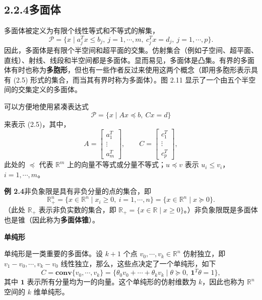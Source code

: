 \documentclass[UTF8,12pt,a4paper,fontset=fandol]{ctexart}
\begin{document}
\subsection*{2.2.4\quad 多面体}

多面体被定义为有限个线性等式和不等式的解集，
\begin{equation}
  \mathcal{P}=\{x\mid a_j^Tx\le b_j,\ j=1,\cdots,m,\ c_j^Tx=d_j,\ j=1,\cdots,p\}.
  \tag{2.5}
\end{equation}
因此，多面体是有限个半空间和超平面的交集。仿射集合（例如子空间、超平面、直线）、射线、线段和半空间都是多面体。显而易见，多面体是凸集。有界的多面体有时也称为\textbf{多胞形}，但也有一些作者反过来使用这两个概念（即用多胞形表示具有 (2.5) 形式的集合，而当其有界时称为多面体）。图 2.11 显示了一个由五个半空间的交集定义的多面体。

可以方便地使用紧凑表达式
\begin{equation}
  \mathcal{P}=\{x\mid Ax\preceq b,\ Cx=d\}
  \tag{2.6}
\end{equation}
来表示 (2.5)，其中，
\[
  A=
  \begin{bmatrix}
    a_1^T\\
    \vdots\\
    a_m^T
  \end{bmatrix},
  \qquad
  C=
  \begin{bmatrix}
    c_1^T\\
    \vdots\\
    c_p^T
  \end{bmatrix},
\]
此处的 $\preceq$ 代表 $\mathbb{R}^m$ 上的向量不等式或分量不等式；$u\preceq v$ 表示 $u_i\le v_i$，$i=1,\cdots,m$。

\noindent\textbf{例 2.4}\quad 非负象限是具有非负分量的点的集合，即
\[
  \mathbb{R}_+^n=\{x\in\mathbb{R}^n\mid x_i\ge 0,\ i=1,\cdots,n\}
  =\{x\in\mathbb{R}^n\mid x\succeq 0\}.
\]
（此处 $\mathbb{R}_+$ 表示非负实数的集合，即 $\mathbb{R}_+=\{x\in\mathbb{R}\mid x\ge 0\}$。）非负象限既是多面体也是锥（因此称为\textbf{多面体锥}）。

\noindent\textbf{单纯形}

单纯形是一类重要的多面体。设 $k+1$ 个点 $v_0,\cdots,v_k\in\mathbb{R}^n$ 仿射独立，即 $v_1-v_0,\cdots,v_k-v_0$ 线性独立，那么，这些点决定了一个单纯形，如下
\begin{equation}
  C=\mathbf{conv}\{v_0,\cdots,v_k\}
  =\{\theta_0v_0+\cdots+\theta_kv_k\mid \theta\succeq 0,\ \mathbf{1}^T\theta=1\},
  \tag{2.7}
\end{equation}
其中 $\mathbf{1}$ 表示所有分量均为一的向量。这个单纯形的仿射维数为 $k$，因此也称为 $\mathbb{R}^n$ 空间的 $k$ 维单纯形。
\end{document}
